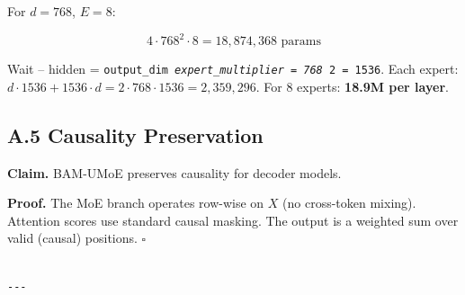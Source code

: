 For $d = 768$, $E = 8$: 

\begin{equation}
4 \cdot 768^2 \cdot 8 = 18{,}874{,}368 \text{ params}
\end{equation}

Wait -- hidden = \texttt{output\_dim \textit{ expert\_multiplier = 768 } 2 = 1536}. Each 
expert: $d \cdot 1536 + 1536 \cdot d = 2 \cdot 768 \cdot 1536 = 2{,}359{,}296$. 
For 8 experts: \textbf{18.9M per layer}.

\subsection{A.5 Causality Preservation}

\textbf{Claim.} BAM-UMoE preserves causality for decoder models.

\textbf{Proof.} The MoE branch operates row-wise on $X$ (no cross-token mixing). 
Attention scores use standard causal masking. The output is a weighted sum 
over valid (causal) positions. $\square$
\begin{lstlisting}

---
\end{lstlisting}